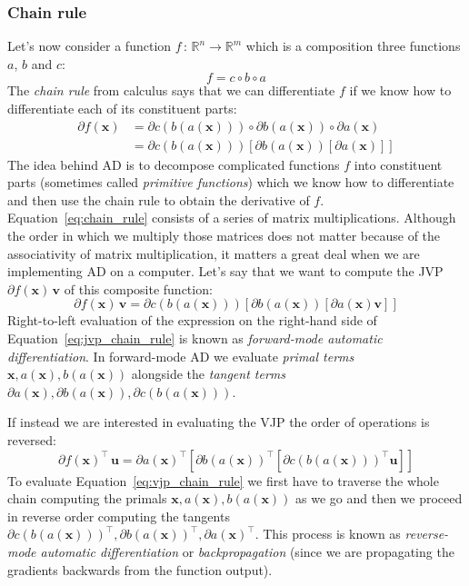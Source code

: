 \documentclass[12pt,dvipsnames]{report}
\renewcommand{\vec}[1]{\boldsymbol{\mathbf{#1}}}
\begin{document}
\subsubsection{Chain rule}
Let's now consider a function $f\,:\, \mathbb{R}^n\rightarrow\mathbb{R}^m$ which is a composition
three functions $a$, $b$ and $c$:
\begin{equation}
f=c \circ b \circ a
\end{equation}
The \textsl{chain rule} from calculus says that we can differentiate $f$ if we know how to differentiate 
each of its constituent parts:
\begin{align}
\partial f(\vec{x})&=\partial c(b(a(\vec{x}))) \circ \partial b(a(\vec{x})) \circ \partial a(\vec{x})\\
&=\partial c(b(a(\vec{x})))[\partial b(a(\vec{x}))[\partial a(\vec{x})]]
\label{eq:chain_rule}
\end{align}
The idea behind AD is to decompose complicated functions $f$ into constituent parts (sometimes 
called \textsl{primitive functions}) which we know how to differentiate  and then use the chain 
rule to obtain the derivative of $f$.
Equation~\ref{eq:chain_rule} consists of a series of matrix multiplications. Although the order
in which we multiply those matrices does not matter because of the associativity of matrix 
multiplication, it matters a great deal when we are implementing AD on a computer.
Let's say that we want to compute the JVP $\partial f(\vec{x})\,\vec v$ of this composite 
function:
\begin{equation}
 \partial f(\vec{x})\,\vec v = \partial c(b(a(\vec{x})))[\partial b(a(\vec{x}))[\partial a(\vec{x})\vec v]]
 \label{eq:jvp_chain_rule}
\end{equation}
Right-to-left evaluation of the expression on the right-hand side of 
Equation~\ref{eq:jvp_chain_rule} is known  as \textsl{forward-mode automatic differentiation}.
In forward-mode AD we evaluate \textsl{primal terms} $\vec{x}, a(\vec{x}), b(a(\vec{x}))$ 
alongside the \textsl{tangent terms} 
$\partial a(\vec{x}), \partial b(a(\vec{x})), \partial c(b(a(\vec{x})))$.

If instead we are interested in evaluating the VJP the order of operations is reversed:
\begin{equation}
\partial f(\vec{x})^{\intercal}\,\vec u=\partial a(\vec{x})^{\intercal}\left[\partial b(a(\vec{x}))^\intercal\left[\partial c(b(a(\vec{x})))^{\intercal}\vec u\right]\right]
\label{eq:vjp_chain_rule}
\end{equation}
To evaluate  Equation~\ref{eq:vjp_chain_rule} we first have to traverse the whole chain 
computing the primals $\vec{x}, a(\vec{x}), b(a(\vec{x}))$ as we go and then we proceed in reverse order 
computing the tangents 
$\partial c(b(a(\vec{x})))^{\intercal}, \partial b(a(\vec{x}))^{\intercal}, \partial a(\vec{x})^{\intercal}$.
This process is known as \textsl{reverse-mode automatic differentiation} or 
\textsl{backpropagation} (since we are propagating the gradients backwards from the function output).
\end{document}
